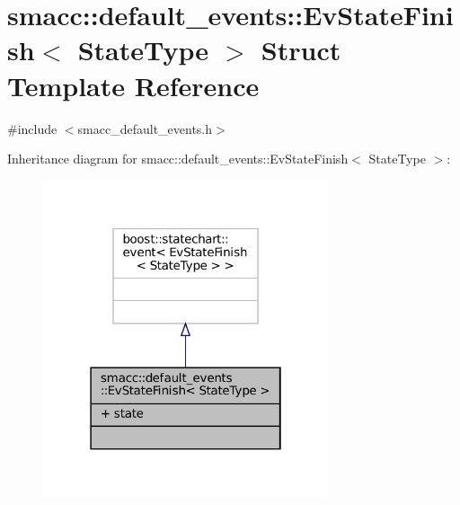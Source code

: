 \hypertarget{structsmacc_1_1default__events_1_1EvStateFinish}{}\section{smacc\+:\+:default\+\_\+events\+:\+:Ev\+State\+Finish$<$ State\+Type $>$ Struct Template Reference}
\label{structsmacc_1_1default__events_1_1EvStateFinish}


{\ttfamily \#include $<$smacc\+\_\+default\+\_\+events.\+h$>$}



Inheritance diagram for smacc\+:\+:default\+\_\+events\+:\+:Ev\+State\+Finish$<$ State\+Type $>$\+:
\nopagebreak
\begin{figure}[H]
\begin{center}
\leavevmode
\includegraphics[width=238pt]{structsmacc_1_1default__events_1_1EvStateFinish__inherit__graph}
\end{center}
\end{figure}


